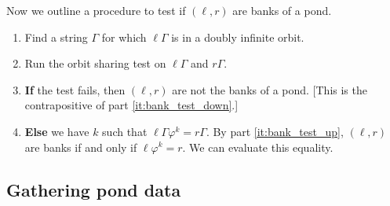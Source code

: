 \documentclass[12pt]{article}
\let\phi\varphi
\newcommand\alert\textbf
\begin{document}
Now we outline a procedure to test if $(\ell, r)$ are banks of a pond.
\begin{enumerate}
	\item Find a string $\Gamma$ for which $\ell\Gamma$ is in a doubly infinite orbit.
	\item Run the orbit sharing test on $\ell\Gamma$ and $r\Gamma$.
	\item \alert{If} the test fails, then $(\ell, r)$ are not the banks of a pond. [This is the contrapositive of part \ref{it:bank_test_down}.]
	\item \alert{Else} we have $k$ such that $\ell\Gamma\phi^k = r \Gamma$. By part \ref{it:bank_test_up}, $(\ell, r)$ are banks if and only if $\ell\phi^k=r$. We can evaluate this equality.

\end{enumerate}

\subsection{Gathering pond data}
\end{document}
